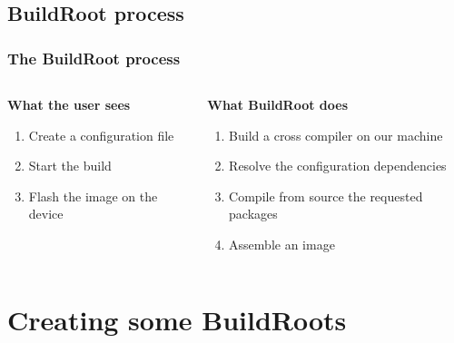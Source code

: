 \documentclass{beamer}
\begin{document}
\subsection{BuildRoot process}
\begin{frame}
  \frametitle{The BuildRoot process}
  \begin{columns}[t] %
    \begin{column}{.5\textwidth}
      \textbf{What the user sees}
      \begin{enumerate}
        \item Create a configuration file
        \item Start the build
        \item Flash the image on the device
      \end{enumerate}
    \end{column}
    \begin{column}{.5\textwidth}
      \textbf{What BuildRoot does}
      \begin{enumerate}
        \item Build a cross compiler on our machine
        \item Resolve the configuration dependencies
        \item Compile from source the requested packages
        \item Assemble an image
      \end{enumerate}
    \end{column}
  \end{columns}
\end{frame}
\section{Creating some BuildRoots}
\end{document}
